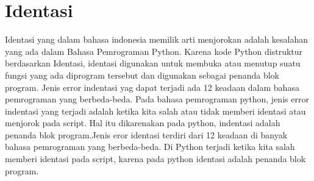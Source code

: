 \chapter*{Identasi}

\par
	Identasi yang dalam bahasa indonesia memilik arti menjorokan adalah kesalahan yang ada dalam Bahasa Pemrograman Python. Karena kode Python distruktur berdasarkan Identasi, identasi digunakan untuk membuka atau menutup suatu fungsi yang ada diprogram tersebut dan digunakan sebagai penanda blok program. Jenis error indentasi yag dapat terjadi ada 12 keadaan dalam bahasa pemrograman yang berbeda-beda. Pada bahasa pemrograman python, jenis error indentasi yang terjadi adalah ketika kita salah atau tidak memberi identasi atau menjorok pada script. Hal itu dikarenakan pada python, indentasi adalah penanda blok program.Jenis eror identasi terdiri dari 12 keadaan di banyak bahasa pemrograman yang berbeda-beda. Di Python terjadi ketika kita salah memberi identasi pada script, karena pada python identasi adalah penanda blok program.
	